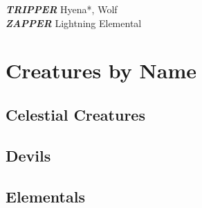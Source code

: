 \textbf{\textit{TRIPPER}} Hyena*, Wolf  \\

\textbf{\textit{ZAPPER}} Lightning Elemental \\

\newpage

\section{Creatures by Name} 

\subsection{Celestial Creatures}


















\subsection{Devils}

\subsection{Elementals}









